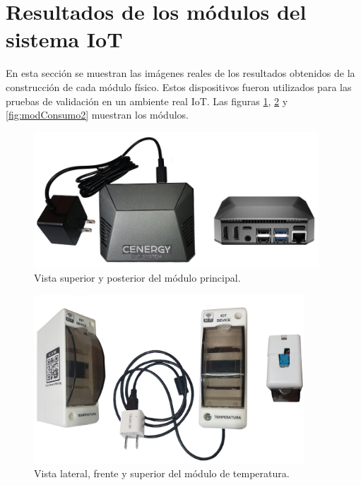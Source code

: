 \section{Resultados de los módulos del sistema IoT}
En esta sección se muestran las imágenes reales de los resultados obtenidos de la construcción de cada módulo físico. Estos dispositivos fueron utilizados para las pruebas de validación en un ambiente real IoT. Las figuras \ref{fig:modPrincipal}, \ref{fig:modTemp} y \ref{fig:modConsumo2} muestran los módulos.

 
\begin{figure}[htpb]
\centering 
\includegraphics[width=0.95\textwidth]{./Figures/principal2.png}
\caption{Vista superior y posterior del módulo principal.}
\label{fig:modPrincipal}
\end{figure}



\begin{figure}[htpb]
\centering 
\includegraphics[width=0.9\textwidth]{./Figures/moduloTemp.png}
\caption{Vista lateral, frente y superior del módulo de temperatura.}
\label{fig:modTemp}
\end{figure}



